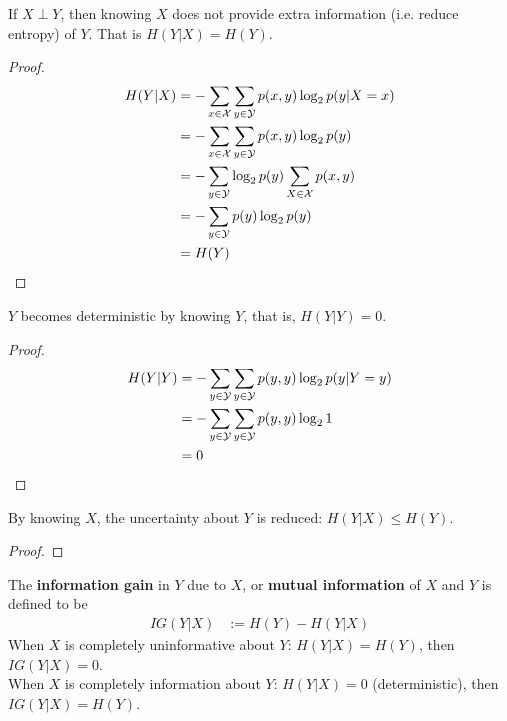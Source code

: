 \documentclass{article}
\begin{document}
	\begin{proposition}
		If $X \perp Y$, then knowing $X$ does not provide extra information (i.e. reduce entropy) of $Y$. That is $H(Y|X) = H(Y)$.
	\end{proposition}
	
	\begin{proof}
		\begin{align}
			H(Y|X) &= - \sum_{x \in \mathcal{{X}}} \sum_{y \in \mathcal{{Y}}} p(x, y) \log_2 p(y | X = x) \\
			&= - \sum_{x \in \mathcal{{X}}} \sum_{y \in \mathcal{{Y}}} p(x, y) \log_2 p(y) \\
			&= - \sum_{y \in \mathcal{{Y}}} \log_2 p(y) \sum_{X \in \mathcal{{X}}} p(x, y) \\
			&= - \sum_{y \in \mathcal{{Y}}} p(y) \log_2 p(y) \\
			&= H(Y)
		\end{align}
	\end{proof}
	
	\begin{proposition}
		$Y$ becomes deterministic by knowing $Y$, that is, $H(Y|Y) = 0$.
	\end{proposition}
	
	\begin{proof}
		\begin{align}
			H(Y|Y) &= - \sum_{y \in \mathcal{{Y}}} \sum_{y \in \mathcal{{Y}}} p(y, y) \log_2 p(y | Y = y) \\
			&= - \sum_{y \in \mathcal{{Y}}} \sum_{y \in \mathcal{{Y}}} p(y, y) \log_2 1 \\
			&= 0
		\end{align}
	\end{proof}
	
	\begin{proposition}
		By knowing $X$, the uncertainty about $Y$ is reduced: $H(Y|X) \leq H(Y)$.
	\end{proposition}
	
	\begin{proof}
	\end{proof}
	
	\begin{definition}
		The \textbf{information gain} in $Y$ due to $X$, or \textbf{mutual information} of $X$ and $Y$ is defined to be
		\begin{align}
			IG(Y|X) &:= H(Y) - H(Y|X)
		\end{align}
		When $X$ is completely uninformative about $Y$: $H(Y|X) = H(Y)$, then $IG(Y|X) = 0$.\\
		When $X$ is completely information about $Y$: $H(Y|X) = 0$ (deterministic), then $IG(Y|X) = H(Y)$.
	\end{definition}
	
\end{document}
